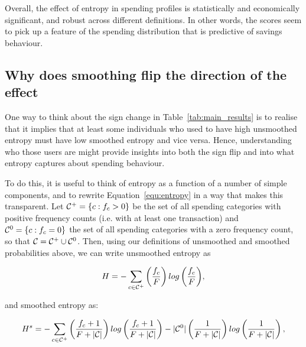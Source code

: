 Overall, the effect of entropy in spending profiles is statistically and
economically significant, and robust across different definitions. In other
words, the scores seem to pick up a feature of the spending distribution that
is predictive of savings behaviour.



\subsection{Why does smoothing flip the direction of the effect}%
\label{sub:why_does_smoothing_flip_the_direction_of_the_effect}

One way to think about the sign change in Table~\ref{tab:main_results} is
to realise that it implies that at least some individuals who used to have high
unsmoothed entropy must have low smoothed entropy and vice versa. Hence,
understanding who those users are might provide insights into both the sign
flip and into what entropy captures about spending behaviour.

To do this, it is useful to think of entropy as a function of a number of
simple components, and to rewrite Equation~\ref{equ:entropy} in a way that
makes this transparent. Let $\mathcal{C}^{+} = \{c: f_c > 0\}$ be the set of all
spending categories with positive frequency counts (i.e.  with at least one
transaction) and $\mathcal{C}^{0} = \{c: f_c = 0\}$ the set of all spending categories
with a zero frequency count, so that $\mathcal{C} = \mathcal{C}^{+} \cup \mathcal{C}^{0}$. Then, using
our definitions of unsmoothed and smoothed probabilities above, we can write
unsmoothed entropy as

\begin{equation}
\label{equ:entropy_us}
H = -\sum_{c \in \mathcal{C}^{+}}{\left(\frac{f_c}{F}\right)
log\left(\frac{f_c}{F}\right)},
\end{equation}

and smoothed entropy as:

\begin{equation}
\label{equ:entropy_s}
H^s = -\sum_{c \in \mathcal{C}^{+}}{\left(\frac{f_c + 1}{F + |\mathcal{C}|}\right)
log\left(\frac{f_c + 1}{F + |\mathcal{C}|}\right)}
- |\mathcal{C}^{0}|\left(\frac{1}{F + |\mathcal{C}|}\right)
log\left(\frac{1}{F + |\mathcal{C}|}\right),
\end{equation}

